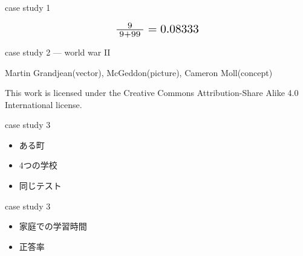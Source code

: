 \documentclass[
  ignorenonframetext,
]{beamer}
\begin{document}
\begin{frame}{case study 1}
\protect\hypertarget{case-study-1-5}{}
\begin{center}\Huge               
\[
 \scalebox{1.4}{$\frac{9}{\;9 + 99\;}=0.08333$}
\]
\end{center}
\end{frame}

\begin{frame}{case study 2 --- world war II}
\protect\hypertarget{case-study-2-world-war-ii}{}
\raggedleft


\tiny

\raggedleft

Martin Grandjean(vector), McGeddon(picture), Cameron Moll(concept)

\vspace{-5pt}

This work is licensed under the Creative Commons Attribution-Share Alike
4.0 International license.

\pause

\Huge
\vspace{-120pt}

\vspace{-130pt}
\end{frame}

\begin{frame}{case study 3}
\protect\hypertarget{case-study-3}{}
\Huge

\begin{itemize}
\item[\textbullet] ある町
\pause
\item[\textbullet] 4つの学校
\pause
\item[\textbullet] 同じテスト
\end{itemize}
\end{frame}

\begin{frame}{case study 3}
\protect\hypertarget{case-study-3-1}{}
\Huge

\begin{itemize}
\item[\textbullet] 家庭での学習時間
\pause
\item[\textbullet] 正答率
\end{itemize}
\pause
\vspace*{-55pt}
\end{frame}
\end{document}
